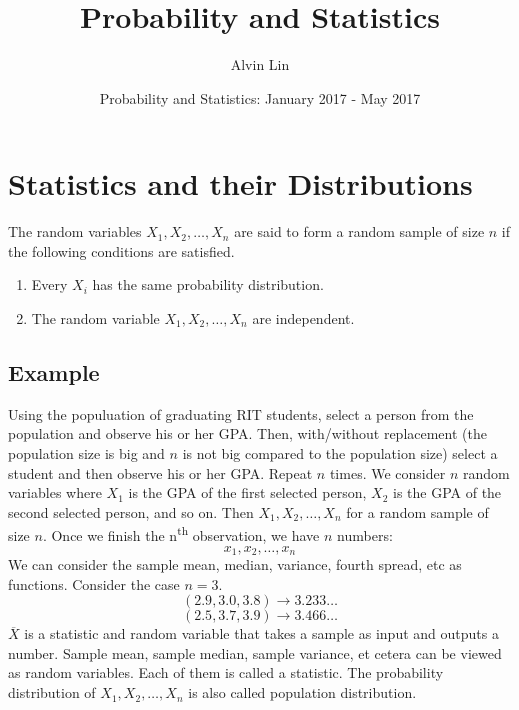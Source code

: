 \documentclass{math}
\title{Probability and Statistics}
\author{Alvin Lin}
\date{Probability and Statistics: January 2017 - May 2017}
\begin{document}
\maketitle

\section*{Statistics and their Distributions}
The random variables \( X_{1},X_{2},\dots,X_{n} \) are said to form a random
sample of size \( n \) if the following conditions are satisfied.
\begin{enumerate}
  \item Every \( X_{i} \) has the same probability distribution.
  \item The random variable \( X_{1},X_{2},\dots,X_{n} \) are independent.
\end{enumerate}

\subsection*{Example}
Using the populuation of graduating RIT students, select a person from the
population and observe his or her GPA. Then, with/without replacement (the
population size is big and \( n \) is not big compared to the population
size) select a student and then observe his or her GPA. Repeat \( n \)
times. We consider \( n \) random variables where \( X_{1} \) is the GPA of
the first selected person, \( X_{2} \) is the GPA of the second selected
person, and so on. Then \( X_{1},X_{2},\dots,X_{n} \) for a random sample of
size \( n \). Once we finish the n\textsuperscript{th} observation, we
have \( n \) numbers:
\[ x_{1},x_{2},\dots,x_{n} \]
We can consider the sample mean, median, variance, fourth spread, etc as
functions. Consider the case \( n = 3 \).
\[ (2.9,3.0,3.8)\to3.233\dots \]
\[ (2.5,3.7,3.9)\to3.466\dots \]
\( \overline{X} \) is a statistic and random variable that takes a sample as
input and outputs a number. Sample mean, sample median, sample variance, et
cetera can be viewed as random variables. Each of them is called a
statistic. The probability distribution of \( X_{1},X_{2},\dots,X_{n} \) is
also called population distribution.
\end{document}
